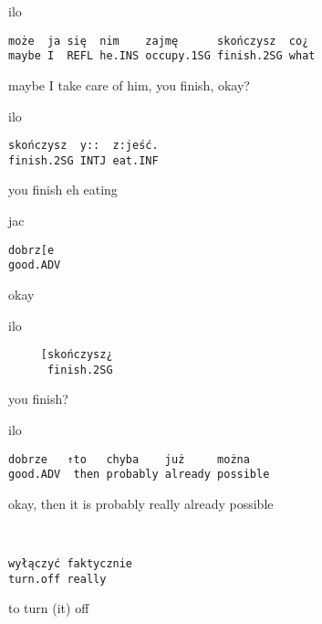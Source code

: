\documentclass[output=paper]{langsci/langscibook}
\begin{document}
\vspace{2mm}
%
\begin{transbox}{1}{ilo}
\begin{verbatim}
może  ja się  nim    zajmę      skończysz  co¿
maybe I  REFL he.INS occupy.1SG finish.2SG what
\end{verbatim}
maybe I take care of him, you finish, okay?
\end{transbox}
%
%
\begin{transbox}{3}{ilo}
\begin{verbatim}
skończysz  y::  z:jeść.
finish.2SG INTJ eat.INF
\end{verbatim}
you finish eh eating
\end{transbox}
%
%
\begin{transbox}{5}{jac}
\begin{verbatim}
dobrz[e
good.ADV
\end{verbatim}
okay
\end{transbox}
%
\begin{transbox}{6}{ilo}
\begin{verbatim}
     [skończysz¿
      finish.2SG
\end{verbatim}
\hspace{0.8cm} you finish?
\end{transbox}
%
%
\begin{mdframednoverticalspace}[style=firstfoc]
\begin{transbox}{8}{ilo}
\begin{verbatim}
dobrze   ↑to   chyba    już     można
good.ADV  then probably already possible
\end{verbatim}
okay, then it is probably really already possible
\end{transbox}
\end{mdframednoverticalspace}
%
\begin{mdframednoverticalspace}[style=firstfoc]
\begin{transbox}{9}{~}
\begin{verbatim}
wyłączyć faktycznie
turn.off really
\end{verbatim}
to turn (it) off
\end{transbox}
\end{mdframednoverticalspace}
%
\begin{mdframednoverticalspace}[style=secondfoc]
\end{mdframednoverticalspace}\vspace{-2mm}
\end{document}
